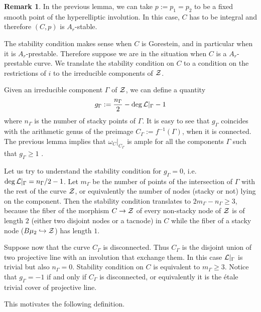 \documentclass{alggeom}
\numberwithin{equation}{section}
\numberwithin{subsection}{section}
\theoremstyle{definition}
\newtheorem{remark}[theorem]{Remark}
\theoremstyle{remark}
\begin{document}
\begin{remark}
	In the previous lemma, we can take $p:=p_1=p_2$ to be a fixed smooth point of the hyperelliptic involution. In this case, $C$ has to be integral and therefore $(C,p)$ is $A_r$-stable. 
\end{remark}

The stability condition makes sense when $C$ is Gorestein, and in particular when it is $A_r$-prestable. Therefore suppose we are in the situation when $C$ is a $A_r$-prestable curve. We translate the stability condition on $C$ to a condition on the restrictions of $i$ to the irreducible components of $\mathcal{Z}$.

Given an irreducible component $\Gamma$ of $\mathcal{Z}$, we can define a quantity $$g_{\Gamma}:=\frac{n_{\Gamma}}{2}-\deg \mathcal{L}\vert_{\Gamma}-1$$ where $n_{\Gamma}$ is the number of stacky points of $\Gamma$. It is easy to see that  $g_{\Gamma}$ coincides with the arithmetic genus of the preimage $C_{\Gamma}:=f^{-1}(\Gamma)$, when it is connected. The previous lemma implies that $\omega_{C}\vert_{C_{\Gamma}}$ is ample for all the components $\Gamma$ such that $g_{\Gamma}\geq 1$ . 

Let us try to understand the stability condition for $g_{\Gamma}=0$, i.e. $\deg\mathcal{L}\vert_{\Gamma}=n_{\Gamma}/2-1$. Let $m_{\Gamma}$ be the number of points of the intersection of $\Gamma$ with the rest of the curve $\mathcal{Z}$, or equivalently the number of nodes (stacky or not) lying on the component. Then the stability condition translates to $2m_{\Gamma}-n_{\Gamma}\geq 3$, because the fiber of the morphism $C\rightarrow \mathcal{Z}$ of every non-stacky node of $\mathcal{Z}$ is of length $2$ (either two disjoint nodes or a tacnode) in $C$ while the fiber of a stacky node ($B\mu_2 \hookrightarrow \mathcal{Z}$) has length $1$.

Suppose now that the curve $C_{\Gamma}$ is disconnected. Thus $C_{\Gamma}$ is the disjoint union of two projective line with an involution that exchange them. In this case $\mathcal{L}\vert_{\Gamma}$ is trivial but also $n_{\Gamma}=0$. Stability condition on $C$ is equivalent to $m_{\Gamma}\geq 3$.  Notice that $g_{\Gamma}=-1$ if and only if $C_{\Gamma}$ is disconnected, or equivalently it is the \'etale trivial cover of projective line. 

This motivates the following definition.
\end{document}
